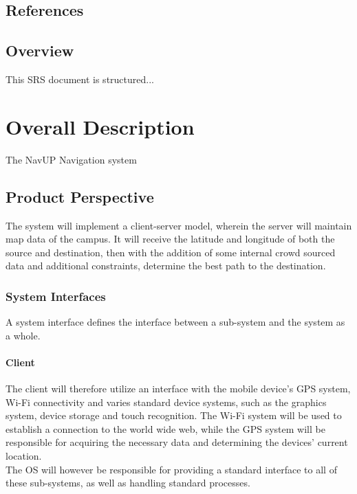 \documentclass[12pt,a4paper]{article}
\begin{document}
		\subsection{References}

		\subsection{Overview}

			This SRS document is structured...

	\section{Overall Description}

		The NavUP Navigation system

		\subsection{Product Perspective}
		
			The system will implement a client-server model, wherein the server will maintain map 
			data of the campus. It will receive the latitude and longitude of both the source and 
			destination, then with the addition of some internal crowd sourced data and additional 
			constraints, determine the best path to the destination. 

			\subsubsection{System Interfaces}
			
				A system interface defines the interface between a sub-system and the system as a whole. 
			
				\paragraph{Client}
				
					The client will therefore utilize an interface with the mobile device's GPS system, 
					Wi-Fi connectivity and varies standard device systems, such as the graphics system, 
					device storage and touch recognition. The Wi-Fi system will be used to establish a 
					connection to the world wide web, while the GPS system will be responsible for 
					acquiring the necessary data and determining the devices' current location.\\
					The OS will however be responsible for providing a standard interface to all of these 
					sub-systems, as well as handling standard processes.
			
\end{document}
